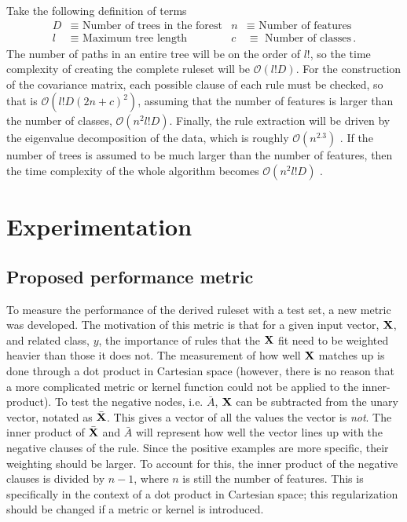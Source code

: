 \documentclass[10pt]{article}
\begin{document}
Take the following definition of terms
\begin{align*}
D & \equiv \text{ Number of trees in the forest} & n & \equiv \text{ Number of features} \\
l &\equiv \text{ Maximum tree length} & c &\equiv \text{ Number of classes} \, .
\end{align*}
The number of paths in an entire tree will be on the order of $l!$, so the time complexity of creating the complete ruleset will be $\mathcal{O}(l! D)$. For the construction of the covariance matrix, each possible clause of each rule must be checked, so that is $\mathcal{O}(l!D(2n+c)^2)$, assuming that the number of features is larger than the number of classes, $\mathcal{O}(n^2l!D)$. Finally, the rule extraction will be driven by the eigenvalue decomposition of the data, which is roughly $\mathcal{O}(n^{2.3})$ \citep{strang2006linear}. If the number of trees is assumed to be much larger than the number of features, then the time complexity of the whole algorithm becomes $\mathcal{O}(n^2 l! D)$ .
 
 
\section{Experimentation}
\label{sec:experiment}
\subsection{Proposed performance metric}
To measure the performance of the derived ruleset with a test set, a new metric was developed. The motivation of this metric is that for a given input vector, $\vb{X}$, and related class, $y$, the importance of rules that the $\vb{X}$ fit need to be weighted heavier than those it does not. The measurement of how well $\vb{X}$ matches up is done through a dot product in Cartesian space (however, there is no reason that a more complicated metric or kernel function could not be applied to the inner-product). To test the negative nodes, i.e. $\bar{A}$, $\vb{X}$ can be subtracted from the unary vector, notated as $\bar{\vb{X}}$. This gives a vector of all the values the vector is \textit{not}. The inner product of $\bar{\vb{X}}$ and $\bar{A}$ will represent how well the vector lines up with the negative clauses of the rule. Since the positive examples are more specific, their weighting should be larger. To account for this, the inner product of the negative clauses is divided by $n-1$, where $n$ is still the number of features. This is specifically in the context of a dot product in Cartesian space; this regularization should be changed if a metric or kernel is introduced. 
\end{document}
